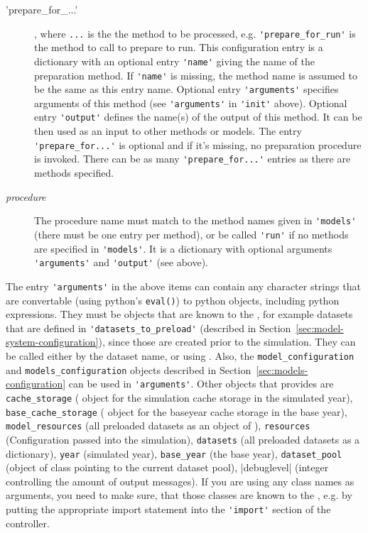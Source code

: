 \begin{description}
\item['prepare_for_...'], where \verb|...| is the the method
to be processed, e.g. \verb|'prepare_for_run'| is the method to call to prepare
to run. This configuration entry is a dictionary with an
optional entry \verb|'name'| giving the name of the preparation method. If \verb|'name'| is
missing, the method name is assumed to be the same as this entry name. Optional
entry \verb|'arguments'| specifies arguments of this method (see \verb|'arguments'| in \verb|'init'|
above). Optional entry \verb|'output'| defines the name(s) of the output of this
method.  It can be then used as an input to other methods or models. The entry
\verb|'prepare_for...'| is optional and if it's missing, no preparation procedure is
invoked. There can be as many \verb|'prepare_for...'| entries as there are
methods specified.
\item[{\it procedure}] The procedure name must match to the method names given
in \verb|'models'| (there must be one entry per method), or be called \verb|'run'| if no
methods are specified in \verb|'models'|. It is a dictionary with optional arguments
\verb|'arguments'| and \verb|'output'| (see above).
\end{description}

The entry \verb|'arguments'| in the above items can contain any character
strings that are convertable (using python's \verb|eval()|) to python \pythonindex objects,
including python \pythonindex expressions. They must be objects that are known to the
, for example datasets \datasetindex that are defined in
\verb|'datasets_to_preload'| (described in
Section~\ref{sec:model-system-configuration}), since those are created prior to
the simulation. They can be called either by the dataset \datasetindex name, or using
. Also, the \verb|model_configuration| and
\verb|models_configuration| objects described in
Section~\ref{sec:models-configuration} can be used in \verb|'arguments'|. Other
objects that  provides are  \verb|cache_storage|
( object for the simulation cache \simulationcacheindex storage
in the simulated year), \verb|base_cache_storage| \baseyearcacheindex ( object for
the baseyear cache \baseyearcacheindex storage in the base year),
\verb|model_resources| (all preloaded datasets as an object of
),  \verb|resources|
(Configuration passed into the simulation), \verb|datasets| (all preloaded datasets as a dictionary),
\verb|year| (simulated year), \verb|base_year| (the base year),
\verb|dataset_pool| (object of class  pointing to the current
dataset pool), \veb|debuglevel| (integer controlling the amount of output messages).  
If you are using any class names
as arguments, you need to make sure, that those classes are known to the
, e.g. by putting the appropriate import statement into the
\verb|'import'| section of the controller.

